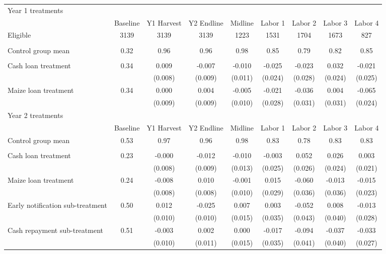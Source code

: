 \begin{tabular}{l cc cc cc cc}
\hline
 Year 1 treatments & & & & & & & & \\
 & Baseline & Y1 Harvest & Y2 Endline & Midline & Labor 1 & Labor 2 & Labor 3 & Labor 4 \\ 
\hline
Eligible & 3139     & 3139     & 3139     & 1223     & 1531     & 1704     & 1673     & 827      \\ 
& & & & & & & & \\ 
Control group mean & 0.32     & 0.96     & 0.96     & 0.98     & 0.85     & 0.79     & 0.82     & 0.85     \\ 
& & & & & & & & \\ 
Cash loan treatment & 0.34     & 0.009 & -0.007 & -0.010 & -0.025 & -0.023 & 0.032 & -0.021 \\ 
 & & (0.008) & (0.009) & (0.011) & (0.024) & (0.028) & (0.024) & (0.025) \\ 
Maize loan treatment & 0.34     & 0.000 & 0.004 & -0.005 & -0.021 & -0.036 & 0.004 & -0.065 \\ 
 & & (0.009) & (0.009) & (0.010) & (0.028) & (0.031) & (0.031) & (0.024) \\ 
\hline
 Year 2 treatments & & & & & & & & \\
 & Baseline & Y1 Harvest & Y2 Endline & Midline & Labor 1 & Labor 2 & Labor 3 & Labor 4 \\ 
\hline
Control group mean & 0.53     & 0.97     & 0.96     & 0.98     & 0.83     & 0.78     & 0.83     & 0.83     \\ 
& & & & & & & & \\ 
Cash loan treatment & 0.23     & -0.000 & -0.012 & -0.010 & -0.003 & 0.052 & 0.026 & 0.003 \\ 
 & & (0.008) & (0.009) & (0.013) & (0.025) & (0.026) & (0.024) & (0.021) \\ 
Maize loan treatment & 0.24     & -0.008 & 0.010 & -0.001 & 0.015 & -0.060 & -0.013 & -0.015 \\ 
 & & (0.008) & (0.008) & (0.010) & (0.029) & (0.036) & (0.036) & (0.023) \\ 
Early notification sub-treatment & 0.50     & 0.012 & -0.025 & 0.007 & 0.003 & -0.052 & 0.008 & -0.013 \\ 
 & & (0.010) & (0.010) & (0.015) & (0.035) & (0.043) & (0.040) & (0.028) \\ 
Cash repayment sub-treatment & 0.51     & -0.003 & 0.002 & 0.000 & -0.017 & -0.094 & -0.037 & -0.033 \\ 
 & & (0.010) & (0.011) & (0.015) & (0.035) & (0.041) & (0.040) & (0.027) \\ 
\hline
\end{tabular}
